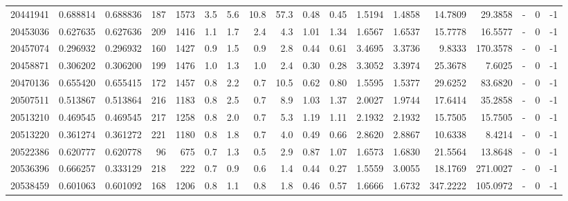 \begin{tabular}{rrrrrrrrrrrrrrrlrr}
  20441941 & 0.688814 &   0.688836 &  187 & 1573 &      3.5 &      5.6 &    10.8 &     57.3 &       0.48 &        0.45 &  1.5194 &  1.4858 &   14.7809 &   29.3858 &             - &        0 &         -1 \\
  20453036 & 0.627635 &   0.627636 &  209 & 1416 &      1.1 &      1.7 &     2.4 &      4.3 &       1.01 &        1.34 &  1.6567 &  1.6537 &   15.7778 &   16.5577 &             - &        0 &         -1 \\
  20457074 & 0.296932 &   0.296932 &  160 & 1427 &      0.9 &      1.5 &     0.9 &      2.8 &       0.44 &        0.61 &  3.4695 &  3.3736 &    9.8333 &  170.3578 &             - &        0 &         -1 \\
  20458871 & 0.306202 &   0.306200 &  199 & 1476 &      1.0 &      1.3 &     1.0 &      2.4 &       0.30 &        0.28 &  3.3052 &  3.3974 &   25.3678 &    7.6025 &             - &        0 &         -1 \\
  20470136 & 0.655420 &   0.655415 &  172 & 1457 &      0.8 &      2.2 &     0.7 &     10.5 &       0.62 &        0.80 &  1.5595 &  1.5377 &   29.6252 &   83.6820 &             - &        0 &         -1 \\
  20507511 & 0.513867 &   0.513864 &  216 & 1183 &      0.8 &      2.5 &     0.7 &      8.9 &       1.03 &        1.37 &  2.0027 &  1.9744 &   17.6414 &   35.2858 &             - &        0 &         -1 \\
  20513210 & 0.469545 &   0.469545 &  217 & 1258 &      0.8 &      2.0 &     0.7 &      5.3 &       1.19 &        1.11 &  2.1932 &  2.1932 &   15.7505 &   15.7505 &             - &        0 &         -1 \\
  20513220 & 0.361274 &   0.361272 &  221 & 1180 &      0.8 &      1.8 &     0.7 &      4.0 &       0.49 &        0.66 &  2.8620 &  2.8867 &   10.6338 &    8.4214 &             - &        0 &         -1 \\
  20522386 & 0.620777 &   0.620778 &   96 &  675 &      0.7 &      1.3 &     0.5 &      2.9 &       0.87 &        1.07 &  1.6573 &  1.6830 &   21.5564 &   13.8648 &             - &        0 &         -1 \\
  20536396 & 0.666257 &   0.333129 &  218 &  222 &      0.7 &      0.9 &     0.6 &      1.4 &       0.44 &        0.27 &  1.5559 &  3.0055 &   18.1769 &  271.0027 &             - &        0 &         -1 \\
  20538459 & 0.601063 &   0.601092 &  168 & 1206 &      0.8 &      1.1 &     0.8 &      1.8 &       0.46 &        0.57 &  1.6666 &  1.6732 &  347.2222 &  105.0972 &             - &        0 &         -1 \\

\end{tabular}
